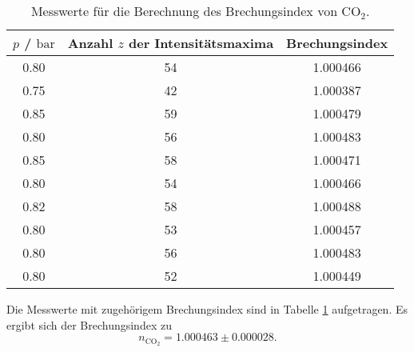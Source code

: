 \begin{table}
	\caption{Messwerte für die Berechnung des Brechungsindex von \texorpdfstring{CO$_2$}{math}.}
	\label{tab:co2brech}
	\centering
	\begin{tabular}{ccc}
	\toprule
	$p$ / $\si{\bar}$ & Anzahl $z$ der Intensitätsmaxima & Brechungsindex \\
	\midrule
		0.80 & 54 & 1.000466 \\
		0.75 & 42 & 1.000387 \\
		0.85 & 59 & 1.000479 \\
		0.80 & 56 & 1.000483 \\
		0.85 & 58 & 1.000471 \\
		0.80 & 54 & 1.000466 \\
		0.82 & 58 & 1.000488 \\
		0.80 & 53 & 1.000457 \\
		0.80 & 56 & 1.000483 \\
		0.80 & 52 & 1.000449 \\
	\bottomrule
	\end{tabular}
\end{table}

Die Messwerte mit zugehörigem Brechungsindex sind in Tabelle \ref{tab:co2brech} aufgetragen.
Es ergibt sich der Brechungsindex zu
\begin{equation}
	n_{\mathrm{CO}_2} = 1.000463 \pm 0.000028 \mathrm{.}
\end{equation}




